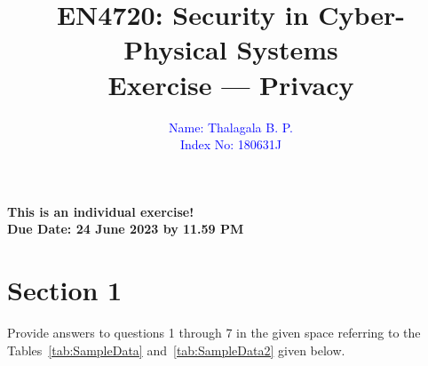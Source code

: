 \documentclass[11pt,letterpaper]{article}
\begin{document}
	
	\title{EN4720: Security in Cyber-Physical Systems \\ Exercise --- Privacy}
	
\author{ \textcolor{blue}{Name: Thalagala B. P.} \\ \textcolor{blue}{Index No: 180631J}}
	
	\maketitle
	
	\begin{center}
		\color{red}\bf This is an individual exercise! \\ Due Date: 24 June 2023 by 11.59 PM
	\end{center}
	
	
	
	\section*{Section 1}
	
	Provide answers to questions 1 through 7 in the given space referring to the Tables~\ref{tab:SampleData} and~\ref{tab:SampleData2} given below.
	
\end{document}

